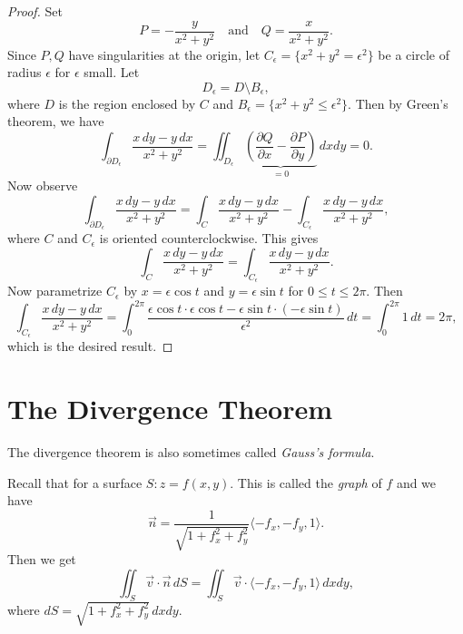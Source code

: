 \begin{proof}
  Set
  \[
    P = - \frac{y}{x^2 + y^2} \quad \text{and} \quad
    Q = \frac{x}{x^2 + y^2}.
  \]
  Since $P, Q$ have singularities at the origin, let
  $C_\epsilon = \{x^2 + y^2 = \epsilon^2\}$ be a circle
  of radius $\epsilon$ for $\epsilon$ small. Let
  \[
    D_\epsilon = D \setminus B_\epsilon,
  \]
  where $D$ is the region enclosed by $C$ and
  $B_\epsilon = \{x^2 + y^2 \le \epsilon^2\}$. Then by
  Green's theorem, we have
  \[
    \int_{\partial D_\epsilon}
    \frac{x\, dy - y\, dx}{x^2 + y^2}
  = \iint_{D_\epsilon} \underbrace{\left( \frac{\partial Q}{\partial x} - \frac{\partial P}{\partial y} \right)}_{= 0} \, dxdy = 0.
  \]
  Now observe
  \[
    \int_{\partial D_\epsilon} \frac{x\, dy - y\, dx}{x^2 + y^2}
    = \int_C \frac{x\, dy - y\, dx}{x^2 + y^2}
    - \int_{C_\epsilon} \frac{x\, dy - y\, dx}{x^2 + y^2},
  \]
  where $C$ and $C_\epsilon$ is oriented counterclockwise.
  This gives
  \[
    \int_C \frac{x\, dy - y\, dx}{x^2 + y^2}
    = \int_{C_\epsilon} \frac{x\, dy - y\, dx}{x^2 + y^2}.
  \]
  Now parametrize $C_\epsilon$ by
  $x = \epsilon \cos t$ and $y = \epsilon \sin t$ for
  $0 \le t \le 2\pi$. Then
  \[
    \int_{C_\epsilon} \frac{x\, dy - y\, dx}{x^2 + y^2}
    = \int_0^{2\pi} \frac{\epsilon \cos t \cdot \epsilon \cos t - \epsilon \sin t \cdot (-\epsilon \sin t)}{\epsilon^2} \, dt
    = \int_0^{2\pi} 1\, dt = 2\pi,
  \]
  which is the desired result.
\end{proof}

\section{The Divergence Theorem}
\begin{remark}
  The divergence theorem is also sometimes called
  \emph{Gauss's formula}.
\end{remark}

\begin{remark}
  Recall that for a surface $S : z = f(x, y)$. This is
  called the \emph{graph} of $f$ and we have
  \[
    \vec{n} = \frac{1}{\sqrt{1 + f_x^2 + f_y^2}} \langle -f_x, -f_y, 1 \rangle.
  \]
  Then we get
  \[
    \iint_S \vec{v} \cdot \vec{n}\, dS
    = \iint_S \vec{v} \cdot \langle -f_x, -f_y, 1\rangle \, dxdy,
  \]
  where $dS = \sqrt{1 + f_x^2 + f_y^2} \, dxdy$.
\end{remark}

